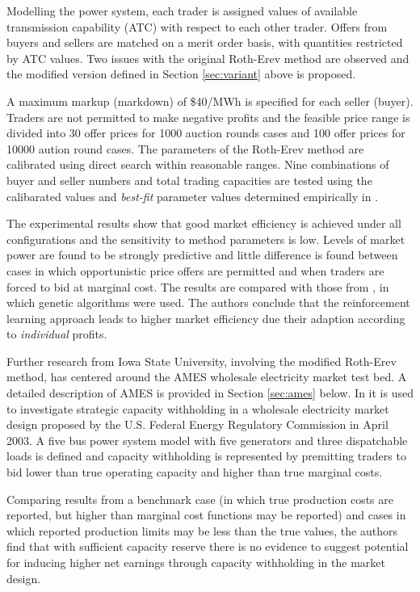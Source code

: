 Modelling the power system, each trader is assigned values of available
transmission capability (ATC) with respect to each other trader.  Offers from buyers and
sellers are matched on a merit order basis, with quantities restricted by
ATC values.  Two issues with the original Roth-Erev method are observed and
the modified version defined in Section \ref{sec:variant} above is proposed.

A maximum markup (markdown) of \$40/MWh is specified for each seller (buyer).
Traders are not permitted to make negative profits and the feasible price range
is divided into 30 offer prices for 1000 auction rounds cases and 100 offer
prices for 10000 aution round cases.  The parameters of the Roth-Erev method are
calibrated using direct search within reasonable ranges.  Nine combinations of
buyer and seller numbers and total trading capacities are tested using the
calibarated values and \textit{best-fit} parameter values determined
empirically in \cite{roth:aer}.

The experimental results show that good market efficiency is achieved under all
configurations and the sensitivity to method parameters is low.  Levels of
market power are found to be strongly predictive and little difference is found
between cases in which opportunistic price offers are permitted and when traders
are forced to bid at marginal cost.  The results are compared with those from
\cite{nicolaisen:2000}, in which genetic algorithms were used.  The authors
conclude that the reinforcement learning approach leads to higher market
efficiency due their adaption according to \textit{individual} profits.

Further research from Iowa State University, involving the modified Roth-Erev
method, has centered around the AMES wholesale electricity market test bed.  A
detailed description of AMES is provided in Section \ref{sec:ames} below.  In
\cite{tesfatsi:psce} it is used to investigate strategic capacity
withholding in a wholesale electricity market design proposed by the U.S.
Federal Energy Regulatory Commission in April 2003.  A five bus power system model
with five generators and three dispatchable loads is defined and capacity
withholding is represented by premitting traders to bid lower than true
operating capacity and higher than true marginal costs.

Comparing results from a benchmark case (in which true production costs are
reported, but higher than marginal cost functions may be reported) and cases in
which reported production limits may be less than the true values, the authors
find that with sufficient capacity reserve there is no evidence to suggest
potential for inducing higher net earnings through capacity withholding in the
market design.

